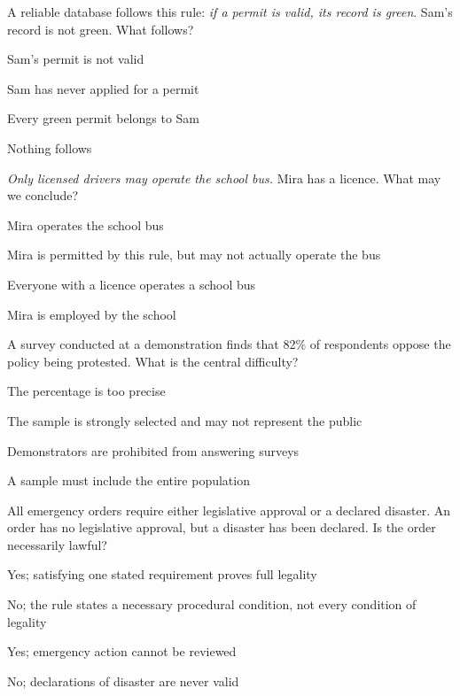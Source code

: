 \documentclass[a4paper,nofonts,sfsidenotes]{tufte-handout}
\begin{document}
\begin{exercisequestions}
  \item A reliable database follows this rule: \emph{if a permit is valid, its
    record is green}. Sam's record is not green. What follows?
    \begin{choices}
      \item Sam's permit is not valid
      \item Sam has never applied for a permit
      \item Every green permit belongs to Sam
      \item Nothing follows
    \end{choices}

  \item \emph{Only licensed drivers may operate the school bus.} Mira has a
    licence. What may we conclude?
    \begin{choices}
      \item Mira operates the school bus
      \item Mira is permitted by this rule, but may not actually operate the bus
      \item Everyone with a licence operates a school bus
      \item Mira is employed by the school
    \end{choices}

  \item A survey conducted at a demonstration finds that 82\% of respondents
    oppose the policy being protested. What is the central difficulty?
    \begin{choices}
      \item The percentage is too precise
      \item The sample is strongly selected and may not represent the public
      \item Demonstrators are prohibited from answering surveys
      \item A sample must include the entire population
    \end{choices}

  \item All emergency orders require either legislative approval or a declared
    disaster. An order has no legislative approval, but a disaster has been
    declared. Is the order necessarily lawful?
    \begin{choices}
      \item Yes; satisfying one stated requirement proves full legality
      \item No; the rule states a necessary procedural condition, not every
        condition of legality
      \item Yes; emergency action cannot be reviewed
      \item No; declarations of disaster are never valid
    \end{choices}
\end{exercisequestions}
\end{document}

